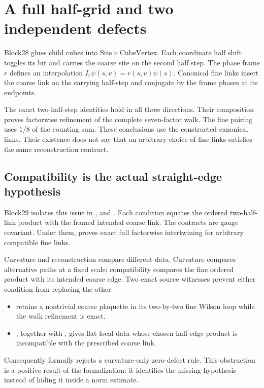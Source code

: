 \section{A full half-grid and two independent defects}

Block28 glues child cubes into \(\mathrm{Site}\times\mathrm{CubeVertex}\). Each coordinate half shift toggles its bit and carries the coarse site on the second half step. The phase frame \(r\) defines an interpolation \(I_r\psi(s,v)=r(s,v)\psi(s)\). Canonical fine links insert the coarse link on the carrying half-step and conjugate by the frame phases at its endpoints.

The exact two-half-step identities hold in all three directions. Their composition proves factorwise refinement of the complete seven-factor walk. The fine pairing uses \(1/8\) of the counting sum. These conclusions use the constructed canonical links. Their existence does not say that an arbitrary choice of fine links satisfies the same reconstruction contract.

\subsection{Compatibility is the actual straight-edge hypothesis}

Block29 isolates this issue in ,  and . Each condition equates the ordered two-half-link product with the framed intended coarse link. The contracts are gauge covariant. Under them,  proves exact full factorwise intertwining for arbitrary compatible fine links.

Curvature and reconstruction compare different data. Curvature compares alternative paths at a fixed scale; compatibility compares the fine ordered product with its intended coarse edge. Two exact source witnesses prevent either condition from replacing the other:
\begin{itemize}
\item {} retains a nontrivial coarse plaquette in its two-by-two fine Wilson loop while the walk refinement is exact.
\item {}, together with , gives flat local data whose chosen half-edge product is incompatible with the prescribed coarse link.
\end{itemize}
Consequently  formally rejects a curvature-only zero-defect rule. This obstruction is a positive result of the formalization: it identifies the missing hypothesis instead of hiding it inside a norm estimate.

